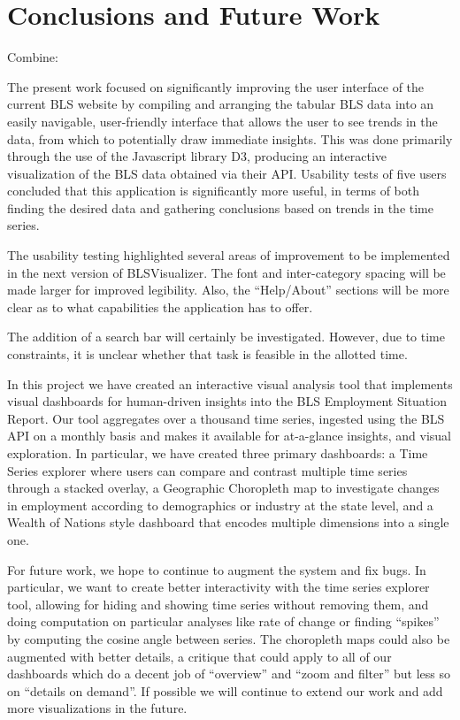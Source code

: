 \documentclass[journal]{IEEEtran}
\newcommand\Peter[1]{{\color{red}#1}}	%
\newcommand\Ben[1]{{\color{blue}#1}}		%
\begin{document}
\section{Conclusions and Future Work}
Combine: 

\Peter{The present work focused on significantly improving the user interface of the current BLS website by compiling and arranging the tabular BLS data into an easily navigable, user-friendly interface that allows the user to see trends in the data, from which to potentially draw immediate insights. This was done primarily through the use of the Javascript library D3, producing an interactive visualization of the BLS data obtained via their API. Usability tests of five users concluded that this application is significantly more useful, in terms of both finding the desired data and gathering conclusions based on trends in the time series. 

The usability testing highlighted several areas of improvement to be implemented in the next version of BLSVisualizer. The font and inter-category spacing will be made larger for improved legibility. Also, the ``Help/About'' sections will be more clear as to what capabilities the application has to offer. 

The addition of a search bar will certainly be investigated. However, due to time constraints, it is unclear whether that task is feasible in the allotted time. }

\Ben{In this project we have created an interactive visual analysis tool that implements visual dashboards for human-driven insights into the BLS Employment Situation Report. Our tool aggregates over a thousand time series, ingested using the BLS API on a monthly basis and makes it available for at-a-glance insights, and visual exploration. In particular, we have created three primary dashboards: a Time Series explorer where users can compare and contrast multiple time series through a stacked overlay, a Geographic Choropleth map to investigate changes in employment according to demographics or industry at the state level, and a Wealth of Nations style dashboard that encodes multiple dimensions into a single one.

For future work, we hope to continue to augment the system and fix bugs. In particular, we want to create better interactivity with the time series explorer tool, allowing for hiding and showing time series without removing them, and doing computation on particular analyses like rate of change or finding ``spikes'' by computing the cosine angle between series. The choropleth maps could also be augmented with better details, a critique that could apply to all of our dashboards which do a decent job of ``overview'' and ``zoom and filter'' but less so on ``details on demand''. If possible we will continue to extend our work and add more visualizations in the future.}
\end{document}
